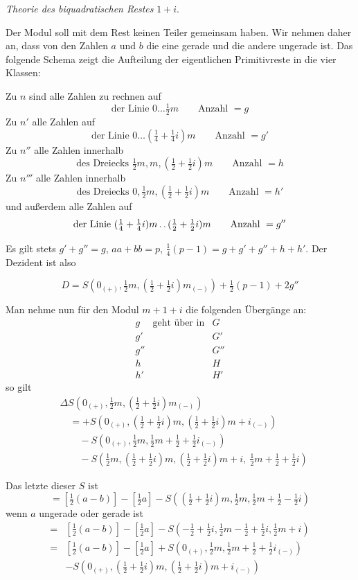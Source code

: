 \clearpage
{}
\begin{center}\emph{Theorie des biquadratischen Restes} $1+i$.\end{center}
Der Modul soll mit dem Rest keinen Teiler gemeinsam haben. Wir nehmen daher an, dass von den Zahlen $a$ und $b$ die eine gerade und die andere ungerade ist. Das folgende Schema zeigt die Aufteilung der eigentlichen Primitivreste in die vier Klassen:
\begin{center}\resizebox{.90\textwidth}{!}{}\end{center}

Zu $n$ sind alle Zahlen zu rechnen auf
\[
\text{der Linie }0\ldots\tfrac12m\qquad\text{Anzahl }=g
\]
Zu $n'$ alle Zahlen auf
\[
\text{der Linie }0\ldots(\tfrac14+\tfrac14i)m\qquad\text{Anzahl }=g'
\]
Zu $n''$ alle Zahlen innerhalb
\[
\text{des Dreiecks }\tfrac12m,m,(\tfrac12+\tfrac12i)m\qquad\text{Anzahl }=h
\]
Zu $n'''$ alle Zahlen innerhalb
\[
\text{des Dreiecks }0,\tfrac12m,(\tfrac12+\tfrac12i)m\qquad\text{Anzahl }=h'
\]
und außerdem alle Zahlen auf
\[
\text{der Linie }(\tfrac14+\tfrac14i)m\mathinner{.\,.}(\tfrac12+\tfrac12i)m\qquad\text{Anzahl }=g''
\]

Es gilt stets $g'+g''=g$, $aa+bb=p$, $\frac14(p-1)=g+g'+g''+h+h'$. Der Dezident ist also

\[
D=S(0_{(+)},\tfrac12m,(\tfrac12+\tfrac12i)m_{(-)})+\tfrac12(p-1)+2g''
\]

Man nehme nun für den Modul $m+1+i$ die folgenden Übergänge an:
\[
\begin{array}{clc}
g&\text{geht über in}&G\\
g'&&G'\\
g''&&G''\\
h&&H\\
h'&&H'
\end{array}
\]
so gilt
\[
\begin{aligned}
&\Delta S(0_{(+)},\tfrac12m,(\tfrac12+\tfrac12i)m_{(-)})\\
&\quad=+S(0_{(+)},(\tfrac12+\tfrac12i)m,(\tfrac12+\tfrac12i)m+i_{(-)})\\
&\qquad-S(0_{(+)},\tfrac12m,\tfrac12m+\tfrac12+\tfrac12i_{(-)})\\
&\qquad-S(\tfrac12m,(\tfrac12+\tfrac12i)m,(\tfrac12+\tfrac12i)m+i,\ \tfrac12m+\tfrac12+\tfrac12i)
\end{aligned}
\]

Das letzte dieser $S$ ist
\[
=\left[\tfrac12(a-b)\right]-\left[\tfrac12a\right]-S((\tfrac12+\tfrac12i)m,\tfrac12m,\tfrac12m+\tfrac12-\tfrac12i)
\]
wenn $a$ ungerade oder gerade ist
\[
\begin{aligned}
={}&\left[\tfrac12(a-b)\right]-\left[\tfrac12a\right]-S(-\tfrac12+\tfrac12i,\tfrac12m-\tfrac12+\tfrac12i,\tfrac12m+i)\\
={}&\left[\tfrac12(a-b)\right]-\left[\tfrac12a\right]+S(0_{(+)},\tfrac12m,\tfrac12m+\tfrac12+\tfrac12i_{(-)})\\
&-S(0_{(+)},(\tfrac12+\tfrac12i)m,(\tfrac12+\tfrac12i)m+i_{(-)})
\end{aligned}
\]

